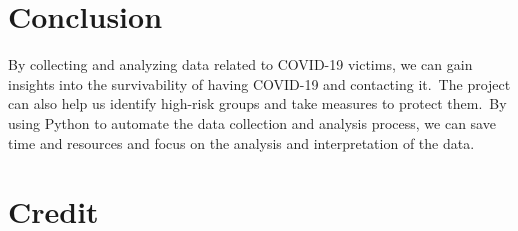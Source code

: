 \documentclass{article}
\begin{document}

\section{Conclusion}

\indent

By collecting and analyzing data related to COVID-19 victims, we can gain insights into the survivability of having COVID-19 and contacting it.\
The project can also help us identify high-risk groups and take measures to protect them.\
By using Python to automate the data collection and analysis process, we can save time and resources and focus on the analysis and interpretation of the data.

\section{Credit}



\end{document}
